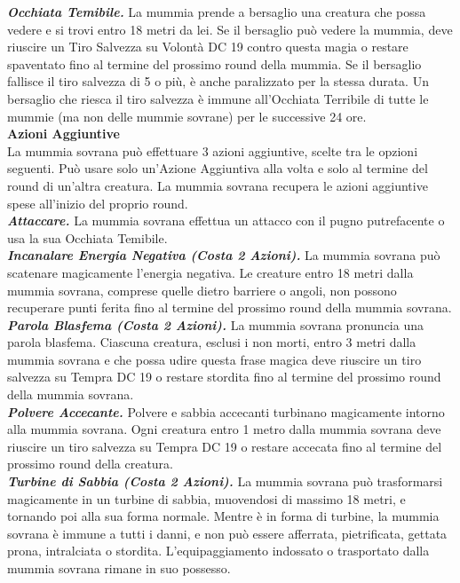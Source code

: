 \begin{multicols}{2}
\emph{\textbf{Occhiata Temibile.}} La mummia prende a bersaglio una creatura che possa vedere e si trovi entro 18 metri da lei. Se il bersaglio può vedere la mummia, deve riuscire un Tiro Salvezza su Volontà DC  19 contro questa magia o restare spaventato fino al termine del prossimo round della mummia. Se il bersaglio fallisce il tiro salvezza di 5 o più, è anche paralizzato per la stessa durata. Un bersaglio che riesca il tiro salvezza è immune all'Occhiata Terribile di tutte le mummie (ma non delle mummie sovrane) per le successive 24 ore.\\

\textbf{Azioni Aggiuntive}\\

La mummia sovrana può effettuare 3 azioni aggiuntive, scelte tra le opzioni seguenti. Può usare solo un'Azione Aggiuntiva alla volta e solo al termine del round di un'altra creatura. La mummia sovrana recupera le azioni aggiuntive spese all'inizio del proprio round.\\

\emph{\textbf{Attaccare.}} La mummia sovrana effettua un attacco con il pugno putrefacente o usa la sua Occhiata Temibile.\\

\emph{\textbf{Incanalare Energia Negativa (Costa 2 Azioni).}} La mummia sovrana può scatenare magicamente l'energia negativa. Le creature entro 18 metri dalla mummia sovrana, comprese quelle dietro barriere o angoli, non possono recuperare punti ferita fino al termine del prossimo round della mummia sovrana.\\

\emph{\textbf{Parola Blasfema (Costa 2 Azioni).}} La mummia sovrana pronuncia una parola blasfema. Ciascuna creatura, esclusi i non morti, entro 3 metri dalla mummia sovrana e che possa udire questa frase magica deve riuscire un tiro salvezza su Tempra DC  19 o restare stordita fino al termine del prossimo round della mummia sovrana.\\

\emph{\textbf{Polvere Accecante.}} Polvere e sabbia accecanti turbinano magicamente intorno alla mummia sovrana. Ogni creatura entro 1 metro dalla mummia sovrana deve riuscire un tiro salvezza su Tempra DC  19 o restare accecata fino al termine del prossimo round della creatura.\\

\emph{\textbf{Turbine di Sabbia (Costa 2 Azioni).}} La mummia sovrana può trasformarsi magicamente in un turbine di sabbia, muovendosi di massimo 18 metri, e tornando poi alla sua forma normale. Mentre è in forma di turbine, la mummia sovrana è immune a tutti i danni, e non può essere afferrata, pietrificata, gettata prona, intralciata o stordita. L'equipaggiamento indossato o trasportato dalla mummia sovrana rimane in suo possesso.\\


\end{multicols}
